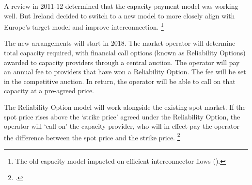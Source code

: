 \documentclass[FrontPage]{grattan}
\begin{document}
A review in 2011-12 determined that the capacity payment model was working well. But Ireland decided to switch to a new model to more closely align with Europe's target model and improve interconnection.%
\footnote{The old capacity model impacted on efficient interconnector flows (\textcite{CIGRE2016CapacityMechanisms}).}

The new arrangements will start in 2018. The market operator will determine total capacity required, with financial call options (known as Reliability Options) awarded to capacity providers through a central auction. The operator will pay an annual fee to providers that have won a Reliability Option. The fee will be set in the competitive auction. In return, the operator will be able to call on that capacity at a pre-agreed price.

The Reliability Option model will work alongside the existing spot market. If the spot price rises above the `strike price' agreed under the Reliability Option, the operator will `call on' the capacity provider, who will in effect pay the operator the difference between the spot price and the strike price.%
\footcite{SEM2014IrelandCapacityDesign}



\printbibliography
\end{document}
